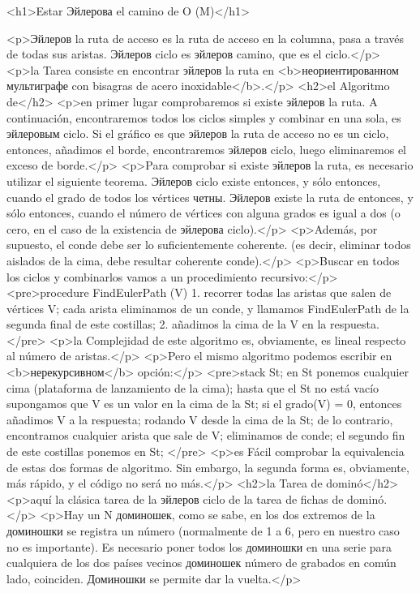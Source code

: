 <h1>Estar Эйлерова el camino de O (M)</h1>

<p>Эйлеров la ruta de acceso es la ruta de acceso en la columna, pasa a través de todas sus aristas. Эйлеров ciclo es эйлеров camino, que es el ciclo.</p>
<p>la Tarea consiste en encontrar эйлеров la ruta en <b>неориентированном мультиграфе con bisagras de acero inoxidable</b>.</p>
<h2>el Algoritmo de</h2>
<p>en primer lugar comprobaremos si existe эйлеров la ruta. A continuación, encontraremos todos los ciclos simples y combinar en una sola, es эйлеровым ciclo. Si el gráfico es que эйлеров la ruta de acceso no es un ciclo, entonces, añadimos el borde, encontraremos эйлеров ciclo, luego eliminaremos el exceso de borde.</p>
<p>Para comprobar si existe эйлеров la ruta, es necesario utilizar el siguiente teorema. Эйлеров ciclo existe entonces, y sólo entonces, cuando el grado de todos los vértices четны. Эйлеров existe la ruta de entonces, y sólo entonces, cuando el número de vértices con alguna grados es igual a dos (o cero, en el caso de la existencia de эйлерова ciclo).</p>
<p>Además, por supuesto, el conde debe ser lo suficientemente coherente. (es decir, eliminar todos aislados de la cima, debe resultar coherente conde).</p>
<p>Buscar en todos los ciclos y combinarlos vamos a un procedimiento recursivo:</p>
<pre>procedure FindEulerPath (V)
1. recorrer todas las aristas que salen de vértices V;
cada arista eliminamos de un conde, y
llamamos FindEulerPath de la segunda final de este costillas;
2. añadimos la cima de la V en la respuesta.</pre>
<p>la Complejidad de este algoritmo es, obviamente, es lineal respecto al número de aristas.</p>
<p>Pero el mismo algoritmo podemos escribir en <b>нерекурсивном</b> opción:</p>
<pre>stack St;
en St ponemos cualquier cima (plataforma de lanzamiento de la cima);
hasta que el St no está vacío
supongamos que V es un valor en la cima de la St;
si el grado(V) = 0, entonces
añadimos V a la respuesta;
rodando V desde la cima de la St;
de lo contrario,
encontramos cualquier arista que sale de V;
eliminamos de conde;
el segundo fin de este costillas ponemos en St;
</pre>
<p>es Fácil comprobar la equivalencia de estas dos formas de algoritmo. Sin embargo, la segunda forma es, obviamente, más rápido, y el código no será no más.</p>
<h2>la Tarea de dominó</h2>
<p>aquí la clásica tarea de la эйлеров ciclo de la tarea de fichas de dominó.</p>
<p>Hay un N доминошек, como se sabe, en los dos extremos de la доминошки se registra un número (normalmente de 1 a 6, pero en nuestro caso no es importante). Es necesario poner todos los доминошки en una serie para cualquiera de los dos países vecinos доминошек número de grabados en común lado, coinciden. Доминошки se permite dar la vuelta.</p>
